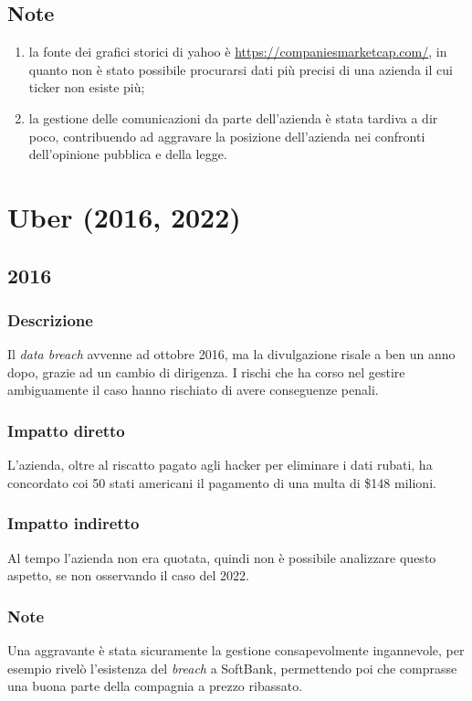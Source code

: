 \documentclass[12pt,a4paper,openright,twoside]{report}
\begin{document}
\subsection{Note}
\begin{enumerate}
    \item la fonte dei grafici storici di yahoo \`e \href{https://companiesmarketcap.com/yahoo/stock-price-history}{https://companiesmarketcap.com/}, in quanto non \`e stato possibile procurarsi dati pi\`u precisi di una azienda il cui ticker non esiste pi\`u;
    \item la gestione delle comunicazioni da parte dell'azienda \`e stata tardiva a dir poco, contribuendo ad aggravare la posizione dell'azienda nei confronti dell'opinione pubblica e della legge.
\end{enumerate}
\section{Uber (2016, 2022)}
\subsection{2016}
\subsubsection{Descrizione}
Il \textit{data breach} avvenne ad ottobre 2016, ma la divulgazione risale a ben un anno dopo, grazie ad un cambio di dirigenza. I rischi che ha corso nel gestire ambiguamente il caso hanno rischiato di avere conseguenze penali\cite{Uber_plusEquifaxAndYahoo}.\\ 
\subsubsection{Impatto diretto}
L'azienda, oltre al riscatto pagato agli hacker per eliminare i dati rubati, ha concordato coi 50 stati americani il pagamento di una multa di \$148 milioni.\\
\subsubsection{Impatto indiretto}
Al tempo l'azienda non era quotata, quindi non \`e possibile analizzare questo aspetto, se non osservando il caso del 2022.\\
\subsubsection{Note}
Una aggravante \`e stata sicuramente la gestione consapevolmente ingannevole, per esempio rivel\`o l'esistenza del \textit{breach} a SoftBank, permettendo poi che comprasse una buona parte della compagnia a prezzo ribassato\cite{Uber_plusEquifaxAndYahoo}.\\   
\end{document}
